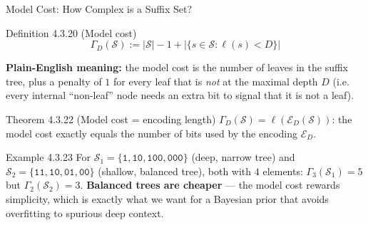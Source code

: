 \documentclass[aspectratio=169,10pt]{beamer}
\begin{document}
\begin{frame}{Model Cost: How Complex is a Suffix Set?}
\begin{block}{Definition 4.3.20 (Model cost)}
$$
\Gamma_D(\mathcal S) := |\mathcal S| - 1 + |\{s\in\mathcal S:\ell(s)<D\}|
$$
\end{block}
\textbf{Plain-English meaning:} the model cost is the number of leaves in the suffix tree,
plus a penalty of $1$ for every leaf that is \emph{not} at the maximal depth $D$ (i.e. every
internal ``non-leaf'' node needs an extra bit to signal that it is not a leaf).

\begin{block}{Theorem 4.3.22 (Model cost = encoding length)}
$\Gamma_D(\mathcal S) = \ell(\mathcal E_D(\mathcal S))$: the model cost exactly equals the
number of bits used by the encoding $\mathcal E_D$.
\end{block}

\begin{exampleblock}{Example 4.3.23}
For $\mathcal S_1=\{\mathtt1,\mathtt{10},\mathtt{100},\mathtt{000}\}$ (deep, narrow tree)
and $\mathcal S_2=\{\mathtt{11},\mathtt{10},\mathtt{01},\mathtt{00}\}$ (shallow, balanced
tree), both with $4$ elements: $\Gamma_3(\mathcal S_1)=5$ but $\Gamma_2(\mathcal S_2)=3$.
\textbf{Balanced trees are cheaper} — the model cost rewards simplicity, which is exactly
what we want for a Bayesian prior that avoids overfitting to spurious deep context.
\end{exampleblock}
\end{frame}
\end{document}

